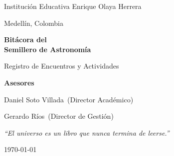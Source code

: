 \documentclass[12pt,oneside]{book}
\newcommand{\Institucion}{Institución Educativa Enrique Olaya Herrera}
\newcommand{\Ciudad}{Medellín, Colombia}
\newcommand{\AsesorPrincipal}{Daniel Soto Villada}
\newcommand{\CoAsesor}{Gerardo Ríos}
\newcommand{\TituloDocumento}{Bitácora del\\[0.4em]Semillero de Astronomía}
\begin{document}
\hypersetup{pageanchor=false}

\begin{titlepage}
    \centering
    \vspace*{1.5cm}

    {\Large\textcolor{grisSec}{\Institucion}\par}
    \vspace{0.2cm}
    {\large\textcolor{grisSec}{\Ciudad}\par}

    \vspace{2.0cm}

    {\Huge\bfseries\textcolor{azulCosmos}{\TituloDocumento}\par}
    \vspace{0.5cm}
    {\Large\textcolor{grisSec}{Registro de Encuentros y Actividades}\par}

    \vspace{2.4cm}

    \begin{tcolorbox}[
        colback=grisClaro,
        colframe=azulCosmos,
        boxrule=0.9pt,
        arc=2mm,
        width=0.82\textwidth
    ]
        \centering
        {\large\bfseries\textcolor{azulCosmos}{Asesores}\par}
        \vspace{0.3cm}
        {\large \AsesorPrincipal\ \textcolor{grisSec}{(Director Académico)}\par}
        \vspace{0.1cm}
        {\large \CoAsesor\ \textcolor{grisSec}{(Director de Gestión)}\par}
    \end{tcolorbox}

    \vspace{1.6cm}

    \begin{tcolorbox}[
        colback=colorIdea,
        colframe=doradoEstrella,
        boxrule=0.7pt,
        arc=2mm,
        width=0.82\textwidth
    ]
        \centering
        \itshape\large\textcolor{grisTexto}{%
        ``El universo es un libro que nunca termina de leerse.''}
    \end{tcolorbox}

    \vfill
    {\large\textcolor{grisSec}{\today}\par}
    \vspace{0.5cm}
\end{titlepage}

\frontmatter
\tableofcontents
\clearpage

\clearpage
\hypersetup{pageanchor=true}
\mainmatter



% 
\end{document}

